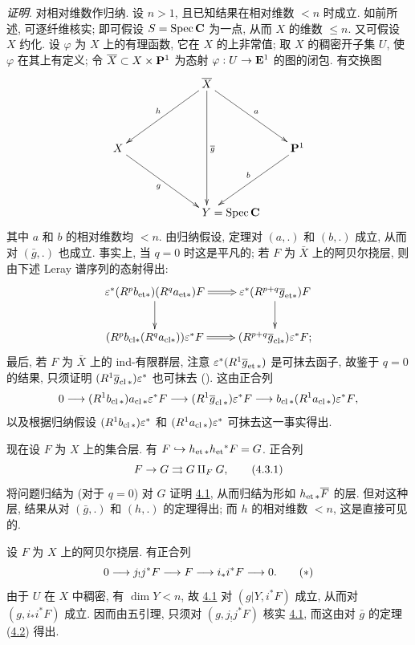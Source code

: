 \noindent
\emph{证明}. 对相对维数作归纳. 设 $n>1$, 且已知结果在相对维数 $<n$ 时成立. 如前所述, 可逐纤维核实; 即可假设 $S=\Spec \CC$ 为一点, 从而 $X$ 的维数 $\leq n$. 又可假设 $X$ 约化. 设 $\varphi$ 为 $X$ 上的有理函数, 它在 $X$ 的上非常值; 取 $X$ 的稠密开子集 $U$, 使 $\varphi$ 在其上有定义; 令 $\bar{X}\subset X\times \PP^{1}$ 为态射 $\varphi:U\rightarrow \EE^{1}$ 的图的闭包. 有交换图
$$
\xymatrix@R=1.5cm@C=1.5cm{
&\bar{X}\ar[ld]_{h} \ar[rd]^{a} \ar[dd]^{\bar{g}}   &\\
X  \ar[rd]_{g}  &                                  &\PP^1 \ar[ld]_{b}\\
            & **[r]Y              =\Spec \CC&
}
$$
其中 $a$ 和 $b$ 的相对维数均 $<n$. 由归纳假设, 定理对 $(a,.)$ 和 $(b,.)$ 成立, 从而对 $(\bar{g},.)$ 也成立. 事实上, 当 $q=0$ 时这是平凡的; 若 $F$ 为 $\bar{X}$ 上的阿贝尔挠层, 则由下述 Leray 谱序列的态射\pageoriginale 得出:
$$
\xymatrix{
\varepsilon^{\ast}(R^{p}b_{\text{et}\ast})(R^{q}a_{\text{et}\ast})F \ar@{=>}[r] \ar[d]&
\varepsilon^{\ast}(R^{p+q}\bar{g}_{\text{et}\ast})F  \ar[d]\\
(R^{p}b_{\text{cl}\ast}(R^{q}{a_{\text{cl}\ast}}))
\varepsilon^{\ast}F  \ar@{=>}[r] & (R^{p+q}\bar{g}_{\text{cl}\ast})\varepsilon^{\ast}F;
}
$$
最后, 若 $F$ 为 $\bar{X}$ 上的 ind-有限群层, 注意 $\epsilon^{\ast}(R^{1}\bar{g}_{\text{\rm et\,}\ast})$ 是可抹去函子, 故鉴于 $q=0$ 的结果, 只须证明 $(R^{1}\bar{g}_{\cl\ast})\epsilon^{\ast}$ 也可抹去 (\cf {}). 这由正合列
$$
0\longrightarrow (R^{1}b_{\cl\ast})a_{\cl
\ast}\epsilon^{\ast}F\longrightarrow (R^{1}\bar{g}_{\cl
\ast})\epsilon^{\ast}F\longrightarrow b_{\cl \ast}(R^{1}a_{\cl
\ast})\epsilon^{\ast}F{\quoi},
$$
以及根据归纳假设 $(R^{1}b_{\cl\ast})\epsilon^{\ast}$ 和 $(R^{1}a_{\cl\ast})\epsilon^{\ast}$ 可抹去这一事实得出.

现在设 $F$ 为 $X$ 上的集合层. 有 $F\hookrightarrow h_{\text{\rm et\,}\ast}h_{\et}{}^{\ast}F=G$. 正合列
\begin{equation*}
F\rightarrow G\rightrightarrows G\amalg_F G{\quoi},\tag{4.3.1}
\end{equation*}
将问题归结为 (对于 $q=0$) 对 $G$ 证明 \hyperref[XVI.thm4.1]{4.1}, 从而归结为形如 $h_{\text{\rm et\,}\ast}\bar{F}$ 的层. 但对这种层, 结果从对 $(\bar{g},.)$ 和 $(h,.)$ 的定理得出; 而 $h$ 的相对维数 $<n$, 这是直接可见的.

设 $F$ 为 $X$ 上的阿贝尔挠层. 有正合列
\begin{equation*}
0\longrightarrow j_{!}j^{\ast}F\longrightarrow F\longrightarrow
i_{\ast}i^{\ast}F\longrightarrow 0{\quoi}.\tag{$\ast$}
\end{equation*}
由于 $U$ 在 $X$ 中稠密, 有 $\dim Y<n$, 故 \hyperref[XVI.thm4.1]{4.1} 对 $(g|Y,i^{\ast}F)$ 成立\pageoriginale, 从而对 $(g,i_{\ast}i^{\ast}F)$ 成立. 因而由五引理, 只须对 $(g,j_{!}j^{\ast}F)$ 核实 \hyperref[XVI.thm4.1]{4.1}, 而这由对 $\bar{g}$ 的定理 (\hyperref[XVI.lem4.2]{4.2}) 得出.

